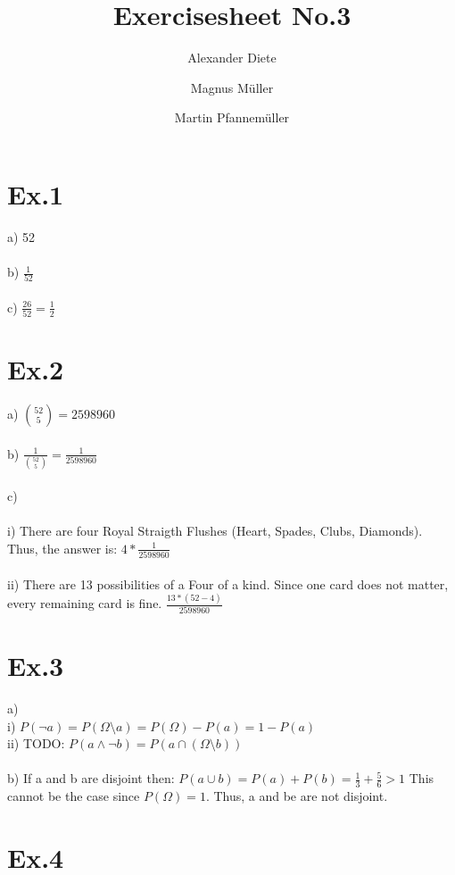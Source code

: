 \documentclass[11pt]{article}
\title{Exercisesheet No.3}
\author{Alexander Diete \and Magnus M\"uller \and Martin Pfannem\"uller}
\begin{document}
\maketitle

\section*{Ex.1}

a) 52 \\
\\
b) $\frac{1}{52}$ \\
\\
c) $\frac{26}{52} = \frac{1}{2}$ \\

\section*{Ex.2}

a) $\binom{52}{5} = 2598960$ \\
\\
b) $\frac{1}{\binom{52}{5}} = \frac{1}{2598960}$ \\
\\
c) \\
\\
i) There are four Royal Straigth Flushes (Heart, Spades, Clubs, Diamonds). Thus, the answer is: $4 * \frac{1}{2598960}$ \\
\\
ii) There are 13 possibilities of a Four of a kind. Since one card does not matter, every remaining card is fine. $\frac{13*(52-4)}{2598960}$

\section*{Ex.3}
a)\\
i) $P(\neg a) = P(\Omega \setminus a) = P(\Omega) - P(a) = 1 - P(a)$ \\
ii) TODO:  $P(a \wedge \neg b) = P(a \cap (\Omega \setminus b))$ \\
\\
b) If a and b are disjoint then: $P(a \cup b) = P(a) + P(b) = \frac{1}{3} + \frac{5}{6} > 1$ This cannot be the case since $P(\Omega) = 1$. Thus, a and be are not disjoint. \\

\section*{Ex.4}
\end{document}
